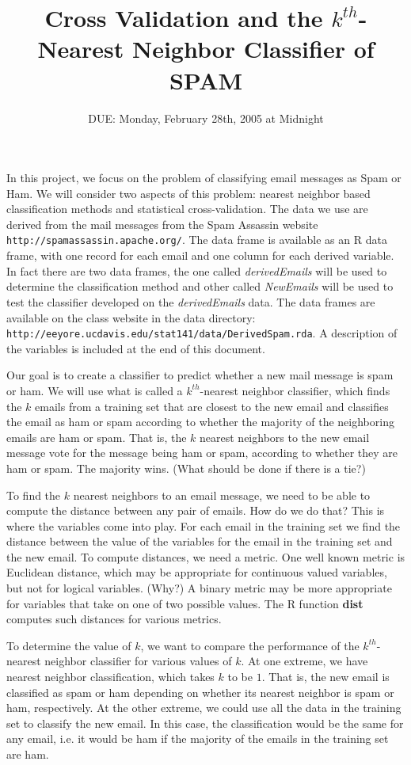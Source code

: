 \documentclass{article}
\title{Cross Validation and the $k^{th}$-Nearest Neighbor 
Classifier of SPAM}
\date{DUE: Monday, February 28th, 2005 at Midnight}
\def\SFunctionRef#1{\textbf{#1}}
\def\Svar#1{\textsl{#1}}
\begin{document}
\maketitle

In this project, we focus on the problem of classifying email messages
as Spam or Ham.  We will consider two aspects of this problem: nearest
neighbor based classification methods and statistical
cross-validation.  The data we use are derived from the mail messages
from the Spam Assassin website
\texttt{http://spamassassin.apache.org/}.  The data frame is available
as an R data frame, with one record for each email and one column for
each derived variable. In fact there are two data frames, the one
called \Svar{derivedEmails} will be used to determine the
classification method and other called \Svar{\Svar{NewEmails}} will be
used to test the classifier developed on the \Svar{derivedEmails}
data.  The data frames are available on the class website in the data
directory:
\texttt{http://eeyore.ucdavis.edu/stat141/data/DerivedSpam.rda}.  A
description of the variables is included at the end of this document.

Our goal is to create a classifier to predict whether a new mail
message is spam or ham.  We will use what is called a $k^{th}$-nearest 
neighbor classifier, which finds the $k$ emails from a training
set that are closest to the new email and classifies the email as 
ham or spam according to whether the majority of the neighboring
emails are ham or spam.  That is, the $k$ nearest neighbors to the 
new email message vote for the message being ham or spam, according
to whether they are ham or spam. The majority wins. (What should
be done if there is a tie?)

To find the $k$ nearest neighbors to an email message, we need to
be able to compute the distance between any pair of emails.
How do we do that? 
This is where the variables come into play.
For each email in the training set
we find the distance between the value of the variables for the 
email in the training set and the new email.
To compute distances, we need a metric.
One well known metric is Euclidean distance, which may
be appropriate for continuous valued variables, but not
for logical variables. (Why?)
A binary metric may be more appropriate for  variables that
take on one of two possible values.  The R function
\SFunctionRef{dist} computes such distances for various metrics.

To determine the value of $k$, we want to compare the
performance of the $k^{th}$-nearest neighbor classifier for various values
of $k$.  At one extreme, we have nearest neighbor classification,
which takes $k$ to be $1$. 
That is, the new email is classified as spam or ham depending on
whether its nearest neighbor is spam or ham, respectively.
At the other extreme, we could use all the data in the training
set to classify the new email. In this case, the classification
would be the same for any email, i.e. it would be ham if the 
majority of the emails in the training set are ham.
\end{document}

